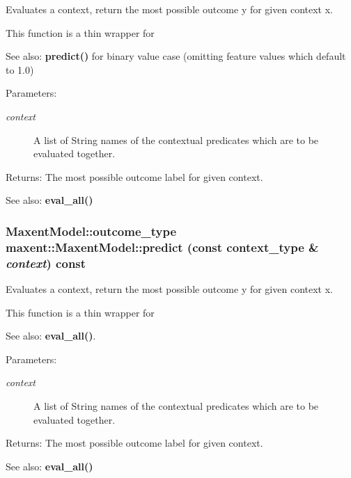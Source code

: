 Evaluates a context, return the most possible outcome y for given context x. 

This function is a thin wrapper for \begin{Desc}
\item[See also:]{\bf predict()} for binary value case (omitting feature values which default to 1.0)\end{Desc}
\begin{Desc}
\item[Parameters:]
\begin{description}
\item[{\em context}]A list of String names of the contextual predicates which are to be evaluated together. \end{description}
\end{Desc}
\begin{Desc}
\item[Returns:]The most possible outcome label for given context. \end{Desc}
\begin{Desc}
\item[See also:]{\bf eval\_\-all()} \end{Desc}
\subsubsection{\setlength{\rightskip}{0pt plus 5cm}Maxent\-Model::outcome\_\-type maxent::Maxent\-Model::predict (const context\_\-type \& {\em context}) const}\label{classmaxent_1_1MaxentModel_a5}


Evaluates a context, return the most possible outcome y for given context x. 

This function is a thin wrapper for \begin{Desc}
\item[See also:]{\bf eval\_\-all()}. \end{Desc}
\begin{Desc}
\item[Parameters:]
\begin{description}
\item[{\em context}]A list of String names of the contextual predicates which are to be evaluated together. \end{description}
\end{Desc}
\begin{Desc}
\item[Returns:]The most possible outcome label for given context. \end{Desc}
\begin{Desc}
\item[See also:]{\bf eval\_\-all()} \end{Desc}
